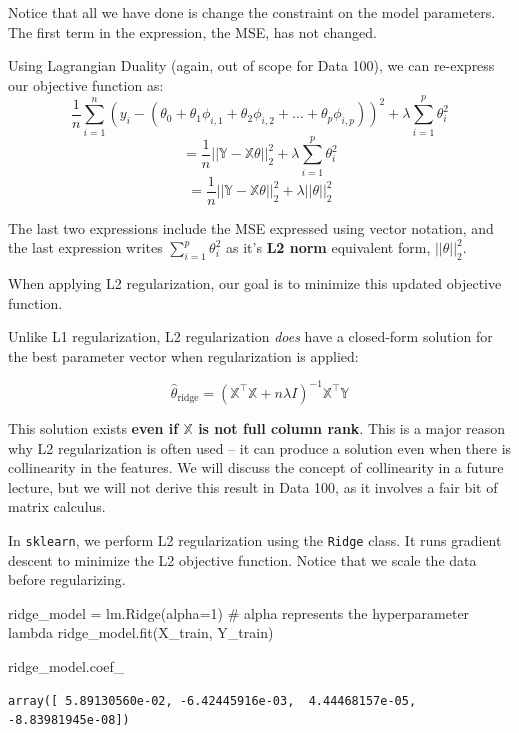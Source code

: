 \documentclass[
  letterpaper,
  DIV=11,
  numbers=noendperiod]{scrreprt}
\newenvironment{Shaded}{\begin{snugshade}}{\end{snugshade}}
\newcommand{\CommentTok}[1]{\textcolor[rgb]{0.37,0.37,0.37}{#1}}
\newcommand{\DecValTok}[1]{\textcolor[rgb]{0.68,0.00,0.00}{#1}}
\newcommand{\NormalTok}[1]{\textcolor[rgb]{0.00,0.23,0.31}{#1}}
\newcommand{\OperatorTok}[1]{\textcolor[rgb]{0.37,0.37,0.37}{#1}}
\begin{document}
Notice that all we have done is change the constraint on the model
parameters. The first term in the expression, the MSE, has not changed.

Using Lagrangian Duality (again, out of scope for Data 100), we can
re-express our objective function as:
\[\frac{1}{n} \sum_{i=1}^n (y_i - (\theta_0 + \theta_1 \phi_{i, 1} + \theta_2 \phi_{i, 2} + \ldots + \theta_p \phi_{i, p}))^2 + \lambda \sum_{i=1}^p \theta_i^2\]
\[= \frac{1}{n}||\mathbb{Y} - \mathbb{X}\theta||_2^2 + \lambda \sum_{i=1}^p \theta_i^2\]
\[= \frac{1}{n}||\mathbb{Y} - \mathbb{X}\theta||_2^2 + \lambda || \theta ||_2^2\]

The last two expressions include the MSE expressed using vector
notation, and the last expression writes \(\sum_{i=1}^p \theta_i^2\) as
it's \textbf{L2 norm} equivalent form, \(|| \theta ||_2^2\).

When applying L2 regularization, our goal is to minimize this updated
objective function.

Unlike L1 regularization, L2 regularization \emph{does} have a
closed-form solution for the best parameter vector when regularization
is applied:

\[\hat\theta_{\text{ridge}} = (\mathbb{X}^{\top}\mathbb{X} + n\lambda I)^{-1}\mathbb{X}^{\top}\mathbb{Y}\]

This solution exists \textbf{even if \(\mathbb{X}\) is not full column
rank}. This is a major reason why L2 regularization is often used -- it
can produce a solution even when there is collinearity in the features.
We will discuss the concept of collinearity in a future lecture, but we
will not derive this result in Data 100, as it involves a fair bit of
matrix calculus.

In \texttt{sklearn}, we perform L2 regularization using the
\texttt{Ridge} class. It runs gradient descent to minimize the L2
objective function. Notice that we scale the data before regularizing.

\begin{Shaded}
\begin{Highlighting}[]
\NormalTok{ridge\_model }\OperatorTok{=}\NormalTok{ lm.Ridge(alpha}\OperatorTok{=}\DecValTok{1}\NormalTok{) }\CommentTok{\# alpha represents the hyperparameter lambda}
\NormalTok{ridge\_model.fit(X\_train, Y\_train)}

\NormalTok{ridge\_model.coef\_}
\end{Highlighting}
\end{Shaded}

\begin{verbatim}
array([ 5.89130560e-02, -6.42445916e-03,  4.44468157e-05, -8.83981945e-08])
\end{verbatim}
\end{document}
